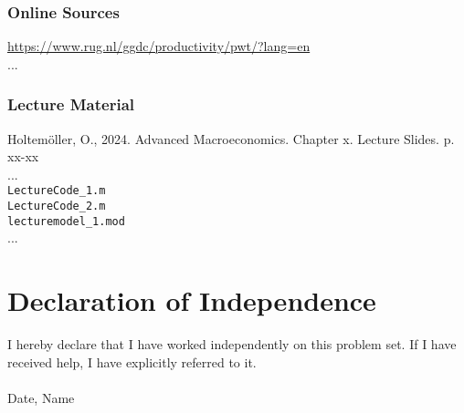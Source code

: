 \documentclass[12pt,a4paper,notitlepage]{article}
\numberwithin{equation}{section}
\begin{document}
\subsubsection*{Online Sources}
\url{https://www.rug.nl/ggdc/productivity/pwt/?lang=en} \\
...
\subsubsection*{Lecture Material}
Holtemöller, O., 2024. Advanced Macroeconomics. Chapter x. Lecture Slides. p. xx-xx \\
...\\
\texttt{LectureCode\_1.m} \\
\texttt{LectureCode\_2.m} \\
\texttt{lecturemodel\_1.mod} \\
...

\section*{Declaration of Independence}
I hereby declare that I have worked independently on this problem set. If I have received help, I have explicitly referred to it. \\
\\
Date, Name
\end{document}
